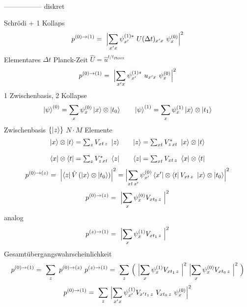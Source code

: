\documentclass[12pt]{article}
\begin{document}
-----------------
diskret

Schrödi + 1 Kollaps
\begin{equation} 
p^{(0)\rightarrow(1)} =\ \Bigl| \sum_{x'x} \psi^{(1)*}_{x'}\ U(\Delta t)_{x'x}\ \psi^{(0)}_x \Bigr|^2
\end{equation}
Elementares $\Delta t$ Planck-Zeit $\hat{U} = \hat{u}^{t/t_{Planck}}$
\begin{equation} 
p^{(0)\rightarrow(1)} =\ \Bigl| \sum_{x'x} \psi^{(1)*}_{x'}\ u_{x'x}\ \psi^{(0)}_x \Bigr|^2
\end{equation}
1 Zwischenbasis, 2 Kollapse
\begin{equation} 
\ket{\psi}^{(0)} =  \sum_{x} \psi^{(0)}_x \ket{x} \otimes \ket{t_0} \quad\quad
\ket{\psi}^{(1)} =  \sum_{x} \psi^{(1)}_x \ket{x} \otimes \ket{t_1}
\end{equation}
Zwischenbasis $\{\ket{z}\}$ $N \cdot M$ Elemente
\begin{equation} 
\begin{matrix}
\ket{x} \otimes \ket{t} = \sum_z V_{xt\, z}\ \ket{z} && 
\ket{z} = \sum_{xt} V^*_{z\, xt}\ \ket{x} \otimes \ket{t} 
\\ \\
\bra{x} \otimes \bra{t} = \sum_z V^*_{z\, xt}\ \bra{z} &&
\bra{z} = \sum_{xt} V_{xt\, z}\ \bra{x} \otimes \bra{t} 
\end{matrix}
\end{equation}
\begin{equation} 
p^{(0)\rightarrow(z)} =\ \Bigl| \bra{z} \hat{V} \left(\ket{x}\otimes\ket{t_0}\right)\Bigr|^2
= \Bigl|\sum_{xt\, x'} \psi^{(0)}_{x'} \bra{x'} \otimes \bra{t} V_{xt\, z}\ \ket{x} \otimes \ket{t_0}\Bigr|^2 
\end{equation}
\begin{equation} 
p^{(0)\rightarrow(z)} =\ \Bigl|\sum_{x} \psi^{(0)}_{x} V_{xt_0\, z}\ \Bigr|^2 
\end{equation}
analog
\begin{equation} 
p^{(z)\rightarrow(1)} =\ \Bigl|\sum_{x} \psi^{(1)}_{x} V_{xt_1\, z}\ \Bigr|^2 
\end{equation}
Gesamtübergangswahrscheinlichkeit
\begin{equation} 
p^{(0)\rightarrow(1)} =\ \sum_z\ p^{(0)\rightarrow(z)}\ p^{(z)\rightarrow(1)}
= \ \sum_{z}\ \Bigl(\ \Bigl|\sum_{x} \psi^{(1)}_{x} V_{xt_1\, z}\ \Bigr|^2\ \Bigl|\sum_{x} \psi^{(0)}_{x} V_{xt_0\, z}\ \Bigr|^2\ \Bigr)
\end{equation}
\begin{equation} 
p^{(0)\rightarrow(1)} 
= \ \sum_{z}\ \Bigl|\sum_{x'x} \psi^{(1)}_{x'} V_{x't_1\, z}\ V_{xt_0\, z}\ \psi^{(0)}_{x} \Bigr|^2  
\end{equation}
\end{document}
